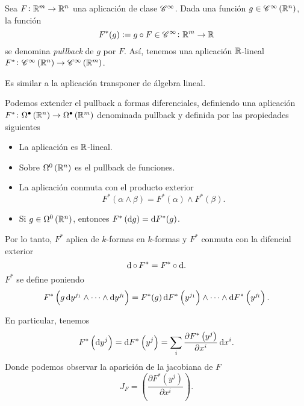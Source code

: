 \begin{defi}
    Sea $F \colon \mathbb{R}^m \to \mathbb{R}^n$ una aplicación de clase $\mathscr{C}^\infty$. Dada una función $g \in \mathscr{C}^\infty\left( \mathbb{R}^n \right)$, la función
    \[
        F^\ast(g) := g \circ F \in \mathscr{C}^\infty \colon \mathbb{R}^m \to \mathbb{R}
    \]
    se denomina \emph{pullback} de $g$ por $F$. Así, tenemos una aplicación $\mathbb{R}$-lineal $F^\ast \colon \mathscr{C}^\infty \left( \mathbb{R}^n \right)
    \to \mathscr{C}^\infty \left( \mathbb{R}^m \right)$.
\end{defi}
\begin{obs}
    Es similar a la aplicación transponer de álgebra lineal.
\end{obs}

\begin{defi}
    Podemos extender el pullback a formas diferenciales, definiendo una aplicación $F^\ast \colon \Omega^\bullet \left( \mathbb{R}^n \right) \to
    \Omega^\bullet\left( \mathbb{R}^m \right)$ denominada pullback y definida por las propiedades siguientes
    \begin{itemize}
        \item La aplicación es $\mathbb{R}$-lineal.
        \item Sobre $\Omega^0\left( \mathbb{R}^n \right)$ es el pullback de funciones.
        \item La aplicación conmuta con el producto exterior
            \[
                F^\ast(\alpha \wedge \beta) = F^\ast(\alpha) \wedge F^\ast(\beta).
            \]
        \item Si $g \in \Omega^0 \left( \mathbb{R}^n \right)$, entonces $F^\ast\left( \dif g \right) = \dif F^\ast(g)$.
    \end{itemize}
    Por lo tanto, $F^\ast$ aplica de $k$-formas en $k$-formas y $F^\ast$ conmuta con la difencial exterior
    \[
        \dif\, \circ\, F^\ast = F^\ast \circ \dif.
    \]
    $F^\ast$ se define poniendo
    \[
        F^\ast\left( g \dif y^{j_1} \wedge \cdots \wedge \dif y^{j_l} \right) = F^\ast(g)\dif F^\ast\left( y^{j_1} \right) \wedge
        \cdots \wedge \dif F^\ast\left( y^{j_l} \right).
    \]
\end{defi}

\begin{obs}
    En particular, tenemos
    \[
        F^\ast \left( \dif y^j \right) = \dif F^\ast\left( y^j \right) =
        \sum_i \frac{\partial F^\ast\left( y^j \right)}{\partial x^i} \dif x^i.
    \]
    Donde podemos observar la aparición de la jacobiana de $F$
    \[
        J_F = \left( \frac{\partial F^\ast \left( y^j \right)}{\partial x^i} \right).
    \]
\end{obs}

